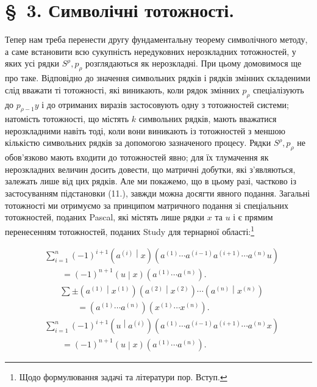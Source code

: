 \documentclass[11pt]{article}
\newcommand{\pair}[2]{\left(#1\middle|#2\right)}
\begin{document}
\section*{\S\ 3. Символічні тотожності.}

Тепер нам треба перенести другу фундаментальну теорему символічного методу, а саме встановити всю сукупність нередуковних нерозкладних тотожностей, у яких усі рядки $S^\rho,p_\rho$ розглядаються як нерозкладні. При цьому домовимося ще про таке. Відповідно до значення символьних рядків і рядків змінних складеними слід вважати ті тотожності, які виникають, коли рядок змінних $p_\rho$ спеціалізують до $p_{\rho-1}y$ і до отриманих виразів застосовують одну з тотожностей системи; натомість тотожності, що містять $k$ символьних рядків, мають вважатися нерозкладними навіть тоді, коли вони виникають із тотожностей з меншою кількістю символьних рядків за допомогою зазначеного процесу. Рядки $S^\rho,p_\rho$ не обов'язково мають входити до тотожностей явно; для їх тлумачення як нерозкладних величин досить довести, що матричні добутки, які з'являються, залежать лише від цих рядків. Але ми покажемо, що в цьому разі, частково із застосуванням підстановки (11.), завжди можна досягти явного подання. Загальні тотожності ми отримуємо за принципом матричного подання зі спеціальних тотожностей, поданих Pascal, які містять лише рядки $x$ та $u$ і є прямим перенесенням тотожностей, поданих Study для тернарної області:\footnote{Щодо формулювання задачі та літератури пор. Вступ.}

\begin{equation}
\begin{aligned}
&\sum_{i=1}^n(-1)^{i+1}\pair{a^{(i)}}{x}
(a^{(1)}\cdots a^{(i-1)}a^{(i+1)}\cdots a^{(n)}u)\\
&\qquad =(-1)^{n+1}\pair{u}{x}(a^{(1)}\cdots a^{(n)}).
\end{aligned}
\tag{13}
\end{equation}
\begin{equation}
\begin{aligned}
&\sum\pm\pair{a^{(1)}}{x^{(1)}}\pair{a^{(2)}}{x^{(2)}}\cdots
\pair{a^{(n)}}{x^{(n)}}\\
&\qquad=(a^{(1)}\cdots a^{(n)})(x^{(1)}\cdots x^{(n)}).
\end{aligned}
\tag{14}
\end{equation}
\begin{equation}
\begin{aligned}
&\sum_{i=1}^n(-1)^{i+1}\pair{u}{a^{(i)}}
(a^{(1)}\cdots a^{(i-1)}a^{(i+1)}\cdots a^{(n)}x)\\
&\qquad =(-1)^{n+1}\pair{u}{x}(a^{(1)}\cdots a^{(n)}).
\end{aligned}
\tag{15}
\end{equation}
\end{document}
